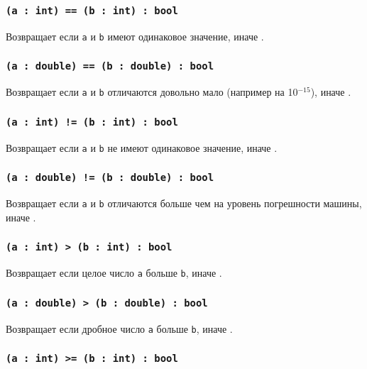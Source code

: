 \subsubsection{\texttt{(a : int) == (b : int) : bool}}

Возвращает \true{} если \texttt{a} и \texttt{b} имеют одинаковое значение, иначе \false{}.

\subsubsection{\texttt{(a : double) == (b : double) : bool}}

Возвращает \true{} если \texttt{a} и \texttt{b} отличаются довольно мало (например на 10$^{-15}$), иначе \false{}.

\subsubsection{\texttt{(a : int) != (b : int) : bool}}

Возвращает \true{} если \texttt{a} и \texttt{b} не имеют одинаковое значение, иначе \false{}.

\subsubsection{\texttt{(a : double) != (b : double) : bool}}

Возвращает \true{} если \texttt{a} и \texttt{b} отличаются больше чем на уровень погрешности машины, иначе \false{}.

\subsubsection{\texttt{(a : int) > (b : int) : bool}}

Возвращает \true{} если целое число \texttt{a} больше \texttt{b}, иначе \false{}.

\subsubsection{\texttt{(a : double) > (b : double) : bool}}

Возвращает \true{} если дробное число \texttt{a} больше \texttt{b}, иначе \false{}.

\subsubsection{\texttt{(a : int) >= (b : int) : bool}}

